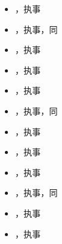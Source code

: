 \begin{itemize}
\item {}，执事
\end{itemize}

\begin{itemize}
\item {}，执事，同
\end{itemize}

\begin{itemize}
\item {}，执事
\end{itemize}

\begin{itemize}
\item {}，执事
\end{itemize}

\begin{itemize}
\item {}，执事
\end{itemize}

\begin{itemize}
\item {}，执事，同
\end{itemize}

\begin{itemize}
\item {}，执事
\end{itemize}

\begin{itemize}
\item {}，执事
\end{itemize}

\begin{itemize}
\item {}，执事
\end{itemize}

\begin{itemize}
\item {}，执事，同
\end{itemize}

\begin{itemize}
\item {}，执事
\end{itemize}

\begin{itemize}
\item {}，执事
\end{itemize}

